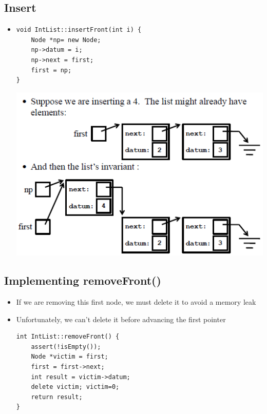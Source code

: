 \subsection{Insert}
\begin{itemize}
	\item 
\begin{lstlisting}[style=C++]
void IntList::insertFront(int i) {
	Node *np= new Node;
	np->datum = i;
	np->next = first;
	first = np;
}
\end{lstlisting}
\begin{center}
	\includegraphics{sections/lec18/front.png}
\end{center}
\end{itemize}

\subsection{Implementing removeFront()}
\begin{itemize}
	\item If we are removing this first node, we must delete it to avoid a memory leak
	\item Unfortunately, we can't delete it before advancing the first pointer
\begin{lstlisting}[style=C++]
int IntList::removeFront() {
	assert(!isEmpty());
	Node *victim = first;
	first = first->next;
	int result = victim->datum;
	delete victim; victim=0;
	return result;
}	
\end{lstlisting}
\end{itemize}

